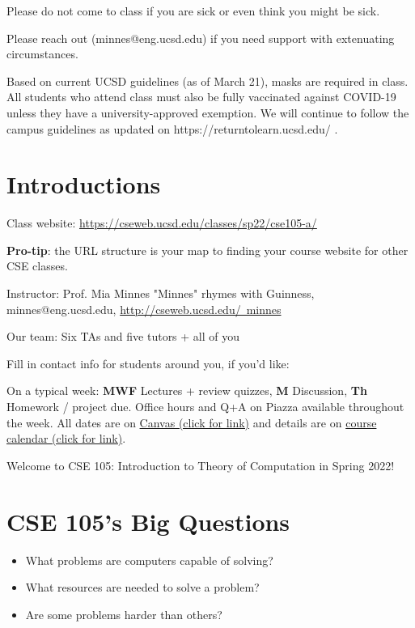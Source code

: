 \documentclass[12pt, oneside]{article}
\begin{document}
Please do not come to class if you are sick or even think you might be sick.

Please reach out (minnes@eng.ucsd.edu) if you need support with extenuating circumstances.

Based on current UCSD guidelines (as of March 21), masks are required in class. 
All students who attend class must also be fully vaccinated against COVID-19
unless they have a university-approved exemption.
We will continue to follow the campus guidelines as updated on https://returntolearn.ucsd.edu/ .


\newpage

\section*{Introductions}
Class website: \href{https://cseweb.ucsd.edu/classes/sp22/cse105-a/}{https://cseweb.ucsd.edu/classes/sp22/cse105-a/}

{\bf Pro-tip}: the URL structure is your map to finding your course website for other CSE classes.

Instructor: Prof. Mia Minnes {\tiny{"Minnes" rhymes with Guinness}}, minnes@eng.ucsd.edu, 
\href{http://cseweb.ucsd.edu/~minnes}{http://cseweb.ucsd.edu/~minnes}

Our team: Six TAs and five tutors + all of you

Fill in contact info for students around you, if you'd like:

\vfill


On a typical week: {\bf MWF} Lectures + review quizzes, {\bf M} Discussion, {\bf Th} Homework / project due.
Office hours and Q+A on Piazza available throughout the week.
All dates are on \href{https://canvas.ucsd.edu/}{Canvas (click for link)} and details are on
 \href{https://theory-cs.github.io/website/overview_calendar.html}{course calendar (click for link)}.

\newpage Welcome to CSE 105: Introduction to Theory of Computation in Spring 2022!

\section*{CSE 105's Big Questions}
\begin{itemize}
   \item What problems are computers capable of solving?
   \item What resources are needed to solve a problem?
   \item Are some problems harder than others?
\end{itemize}
\end{document}
